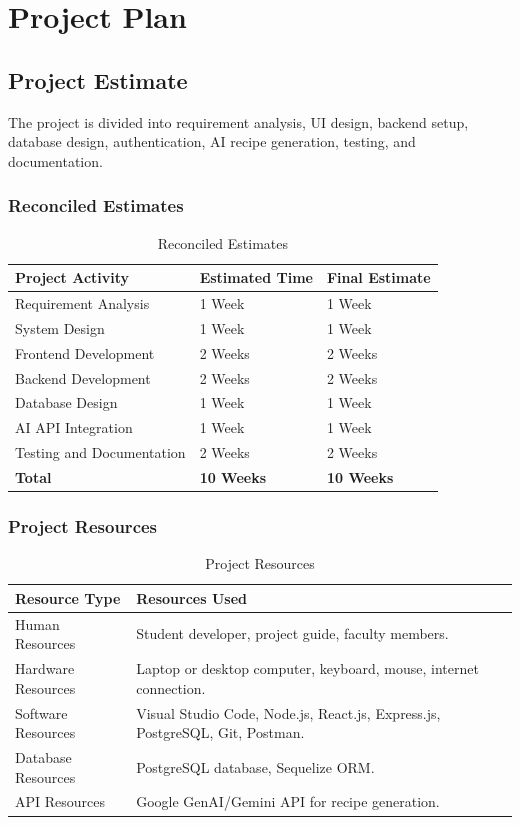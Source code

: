 \section{Project Plan}

\subsection{Project Estimate}
The project is divided into requirement analysis, UI design, backend setup, database design, authentication, AI recipe generation, testing, and documentation.

\subsubsection{Reconciled Estimates}
\begin{table}[h]
\centering
\caption{Reconciled Estimates}
\begin{tabularx}{\textwidth}{|X|p{3cm}|p{3cm}|}
\hline
\textbf{Project Activity} & \textbf{Estimated Time} & \textbf{Final Estimate} \\
\hline
Requirement Analysis & 1 Week & 1 Week \\
\hline
System Design & 1 Week & 1 Week \\
\hline
Frontend Development & 2 Weeks & 2 Weeks \\
\hline
Backend Development & 2 Weeks & 2 Weeks \\
\hline
Database Design & 1 Week & 1 Week \\
\hline
AI API Integration & 1 Week & 1 Week \\
\hline
Testing and Documentation & 2 Weeks & 2 Weeks \\
\hline
\textbf{Total} & \textbf{10 Weeks} & \textbf{10 Weeks} \\
\hline
\end{tabularx}
\end{table}

\subsubsection{Project Resources}
\begin{table}[h]
\centering
\caption{Project Resources}
\begin{tabularx}{\textwidth}{|p{4cm}|X|}
\hline
\textbf{Resource Type} & \textbf{Resources Used} \\
\hline
Human Resources & Student developer, project guide, faculty members. \\
\hline
Hardware Resources & Laptop or desktop computer, keyboard, mouse, internet connection. \\
\hline
Software Resources & Visual Studio Code, Node.js, React.js, Express.js, PostgreSQL, Git, Postman. \\
\hline
Database Resources & PostgreSQL database, Sequelize ORM. \\
\hline
API Resources & Google GenAI/Gemini API for recipe generation. \\
\hline
\end{tabularx}
\end{table}

